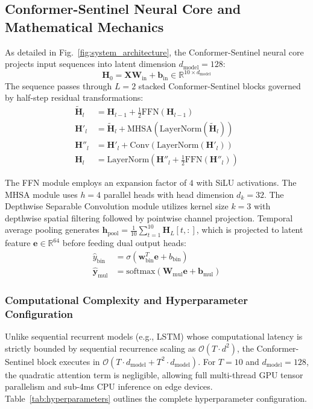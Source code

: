 \documentclass[11pt,a4paper]{article}
\begin{document}
\subsection{Conformer-Sentinel Neural Core and Mathematical Mechanics}
As detailed in Fig.~\ref{fig:system_architecture}, the Conformer-Sentinel neural core projects input sequences into latent dimension $d_{\text{model}} = 128$:
\begin{equation}
    \mathbf{H}_0 = \mathbf{X} \mathbf{W}_{\text{in}} + \mathbf{b}_{\text{in}} \in \mathbb{R}^{10 \times d_{\text{model}}}
\end{equation}
The sequence passes through $L = 2$ stacked Conformer-Sentinel blocks governed by half-step residual transformations:
\begin{align}
    \tilde{\mathbf{H}}_l &= \mathbf{H}_{l-1} + \frac{1}{2} \text{FFN}(\mathbf{H}_{l-1}) \\
    \mathbf{H}'_l &= \tilde{\mathbf{H}}_l + \text{MHSA}(\text{LayerNorm}(\tilde{\mathbf{H}}_l)) \\
    \mathbf{H}''_l &= \mathbf{H}'_l + \text{Conv}(\text{LayerNorm}(\mathbf{H}'_l)) \\
    \mathbf{H}_l &= \text{LayerNorm}\left(\mathbf{H}''_l + \frac{1}{2} \text{FFN}(\mathbf{H}''_l)\right)
\end{align}

The FFN module employs an expansion factor of $4$ with SiLU activations. The MHSA module uses $h = 4$ parallel heads with head dimension $d_k = 32$. The Depthwise Separable Convolution module utilizes kernel size $k = 3$ with depthwise spatial filtering followed by pointwise channel projection. Temporal average pooling generates $\mathbf{h}_{\text{pool}} = \frac{1}{10} \sum_{t=1}^{10} \mathbf{H}_L[t, :]$, which is projected to latent feature $\mathbf{e} \in \mathbb{R}^{64}$ before feeding dual output heads:
\begin{align}
    \hat{y}_{\text{bin}} &= \sigma(\mathbf{w}_{\text{bin}}^T \mathbf{e} + b_{\text{bin}}) \\
    \hat{\mathbf{y}}_{\text{mul}} &= \text{softmax}(\mathbf{W}_{\text{mul}} \mathbf{e} + \mathbf{b}_{\text{mul}})
\end{align}

\subsubsection{Computational Complexity and Hyperparameter Configuration}
Unlike sequential recurrent models (e.g., LSTM) whose computational latency is strictly bounded by sequential recurrence scaling as $\mathcal{O}(T \cdot d^2)$, the Conformer-Sentinel block executes in $\mathcal{O}(T \cdot d_{\text{model}} + T^2 \cdot d_{\text{model}})$. For $T=10$ and $d_{\text{model}}=128$, the quadratic attention term is negligible, allowing full multi-thread GPU tensor parallelism and sub-4ms CPU inference on edge devices. Table~\ref{tab:hyperparameters} outlines the complete hyperparameter configuration.
\end{document}
